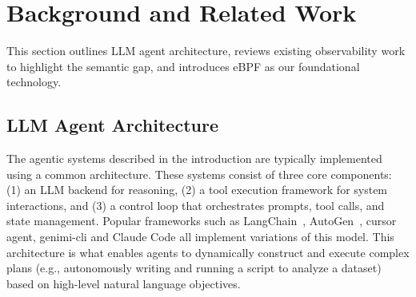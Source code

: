 \section{Background and Related Work}

This section outlines LLM agent architecture, reviews existing observability work to highlight the semantic gap, and introduces eBPF as our foundational technology.


\subsection{LLM Agent Architecture}
The agentic systems described in the introduction are typically implemented using a common architecture. These systems consist of three core components: (1) an LLM backend for reasoning, (2) a tool execution framework for system interactions, and (3) a control loop that orchestrates prompts, tool calls, and state management. Popular frameworks such as LangChain~\cite{langchain}, AutoGen~\cite{autogen}, cursor agent\cite{cursor}, genimi-cli\cite{geminicli} and Claude Code\cite{claudecode} all implement variations of this model. This architecture is what enables agents to dynamically construct and execute complex plans (e.g., autonomously writing and running a script to analyze a dataset) based on high-level natural language objectives.

